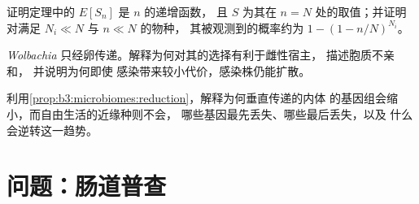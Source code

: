 \begin{exercise}[$\star\star\star$]\label{exo:b3:microbiomes:10}
证明定理中的 $E[S_{n}]$ 是 $n$ 的递增函数，
且 $S$ 为其在 $n = N$ 处的取值；并证明对满足 $N_{i} \ll N$ 与 $n \ll N$ 的物种，
其被观测到的概率约为
$1 - (1 - n/N)^{N_{i}}$。
\end{exercise}

\begin{exercise}[$\star\star\star$]\label{exo:b3:microbiomes:11}
\emph{Wolbachia} 只经卵传递。解释为何对其的选择有利于雌性宿主，
描述胞质不亲和，
并说明为何即使
感染带来较小代价，感染株仍能扩散。
\end{exercise}

\begin{exercise}[$\star\star\star$]\label{exo:b3:microbiomes:12}
利用\cref{prop:b3:microbiomes:reduction}，解释为何垂直传递的内体
的基因组会缩小，而自由生活的近缘种则不会，
哪些基因最先丢失、哪些最后丢失，以及
什么会逆转这一趋势。
\end{exercise}

\section{问题：肠道普查}

